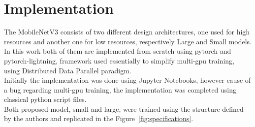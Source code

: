 \documentclass[12pt, letterpaper, twoside]{article}
\begin{document}
\section{Implementation}
The MobileNetV3 consists of two different design architectures, one used for high resources and another one for low resources, respectively Large and Small models. In this work both of them are implemented from scratch using pytorch and pytorch-lightning, framework used essentially to simplify multi-gpu training, using Distributed Data Parallel paradigm. \\
Initially the implementation was done using Jupyter Notebooks, however cause of a bug regarding multi-gpu training, the implementation was completed using classical python script files. \\
Both proposed model, small and large, were trained using the structure defined by the authors and replicated in the Figure~\ref{fig:specifications}.
\end{document}
